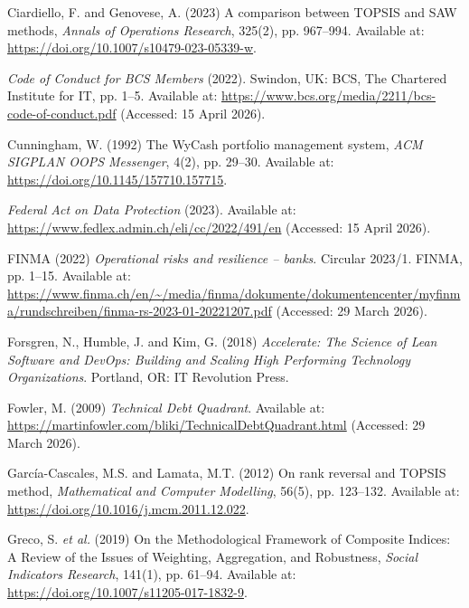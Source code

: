 \documentclass[
  12pt,
  letterpaper,
  12pt,
  oneside,
  english,
  onehalfspacing,
  headsepline]{MastersDoctoralThesis}
\newlength{\cslhangindent}
\newenvironment{CSLReferences}[2] %
 {\begin{list}{}{%
  \setlength{\itemindent}{0pt}
  \setlength{\leftmargin}{0pt}
  \setlength{\parsep}{0pt}
  \ifodd #1
   \setlength{\leftmargin}{\cslhangindent}
   \setlength{\itemindent}{-1\cslhangindent}
  \fi
  \setlength{\itemsep}{#2\baselineskip}}}
 {\end{list}}
\begin{document}
\begin{CSLReferences}{0}{1}
Ciardiello, F. and Genovese, A. (2023) \textquotesingle A comparison
between {TOPSIS} and {SAW} methods\textquotesingle, \emph{Annals of
Operations Research}, 325(2), pp. 967--994. Available at:
\url{https://doi.org/10.1007/s10479-023-05339-w}.

\emph{Code of {Conduct} for {BCS Members}} (2022). Swindon, UK: BCS, The
Chartered Institute for IT, pp. 1--5. Available at:
\url{https://www.bcs.org/media/2211/bcs-code-of-conduct.pdf} (Accessed:
15 April 2026).

Cunningham, W. (1992) \textquotesingle The {WyCash} portfolio management
system\textquotesingle, \emph{ACM SIGPLAN OOPS Messenger}, 4(2), pp.
29--30. Available at: \url{https://doi.org/10.1145/157710.157715}.

\emph{Federal {Act} on {Data Protection}} (2023). Available at:
\url{https://www.fedlex.admin.ch/eli/cc/2022/491/en} (Accessed: 15 April
2026).

FINMA (2022) \emph{Operational risks and resilience -- banks}. Circular
2023/1. FINMA, pp. 1--15. Available at:
\url{https://www.finma.ch/en/~/media/finma/dokumente/dokumentencenter/myfinma/rundschreiben/finma-rs-2023-01-20221207.pdf}
(Accessed: 29 March 2026).

Forsgren, N., Humble, J. and Kim, G. (2018) \emph{Accelerate: {The
Science} of {Lean Software} and {DevOps}: {Building} and {Scaling High
Performing Technology Organizations}}. Portland, OR: IT Revolution
Press.

Fowler, M. (2009) \emph{Technical {Debt Quadrant}}. Available at:
\url{https://martinfowler.com/bliki/TechnicalDebtQuadrant.html}
(Accessed: 29 March 2026).

García-Cascales, M.S. and Lamata, M.T. (2012) \textquotesingle On rank
reversal and {TOPSIS} method\textquotesingle, \emph{Mathematical and
Computer Modelling}, 56(5), pp. 123--132. Available at:
\url{https://doi.org/10.1016/j.mcm.2011.12.022}.

Greco, S. \emph{et al.} (2019) \textquotesingle On the {Methodological
Framework} of {Composite Indices}: {A Review} of the {Issues} of
{Weighting}, {Aggregation}, and {Robustness}\textquotesingle,
\emph{Social Indicators Research}, 141(1), pp. 61--94. Available at:
\url{https://doi.org/10.1007/s11205-017-1832-9}.


\end{CSLReferences}
\end{document}
